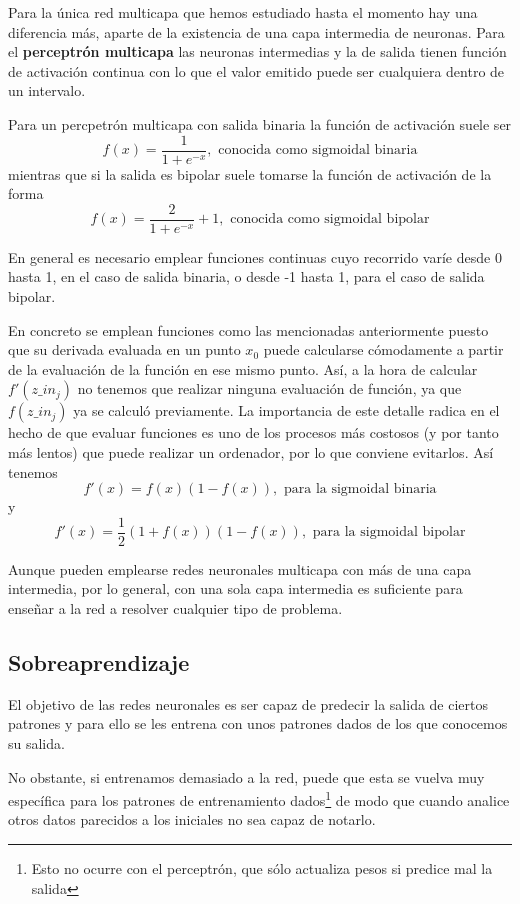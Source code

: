 Para la única red multicapa que hemos estudiado hasta el momento hay una diferencia más, aparte de la existencia de una capa intermedia de neuronas. Para el \textbf{perceptrón multicapa} las neuronas intermedias y la de salida tienen función de activación continua con lo que el valor emitido puede ser cualquiera dentro de un intervalo.

Para un percpetrón multicapa con salida binaria la función de activación suele ser
\[f(x) = \frac{1}{1+e^{-x}}, \text{ conocida como sigmoidal binaria}\]
mientras que si la salida es bipolar suele tomarse la función de activación de la forma
\[f(x) = \frac{2}{1+e^{-x}}+1, \text{ conocida como sigmoidal bipolar}\]

En general es necesario emplear funciones continuas cuyo recorrido varíe desde 0 hasta 1, en el caso de salida binaria, o desde -1 hasta 1, para el caso de salida bipolar.

En concreto se emplean funciones como las mencionadas anteriormente puesto que su derivada evaluada en un punto $x_0$ puede calcularse cómodamente a partir de la evaluación de la función en ese mismo punto. Así, a la hora de calcular $f'(z\_in_j)$ no tenemos que realizar ninguna evaluación de función, ya que $f(z\_in_j)$ ya se calculó previamente. La importancia de este detalle radica en el hecho de que evaluar funciones es uno de los procesos más costosos (y por tanto más lentos) que puede realizar un ordenador, por lo que conviene evitarlos. Así tenemos
\[f'(x) = f(x) (1-f(x)), \text{ para la sigmoidal binaria}\]
y
\[f'(x) = \frac{1}{2}(1+f(x))(1-f(x)), \text{ para la sigmoidal bipolar}\]

Aunque pueden emplearse redes neuronales multicapa con más de una capa intermedia, por lo general, con una sola capa intermedia es suficiente para enseñar a la red a resolver cualquier tipo de problema.

\subsection{Sobreaprendizaje}

El objetivo de las redes neuronales es ser capaz de predecir la salida de ciertos patrones y para ello se les entrena con unos patrones dados de los que conocemos su salida.

No obstante, si entrenamos demasiado a la red, puede que esta se vuelva muy específica para los patrones de entrenamiento dados\footnote{Esto no ocurre con el perceptrón, que sólo actualiza pesos si predice mal la salida} de modo que cuando analice otros datos parecidos a los iniciales no sea capaz de notarlo.

